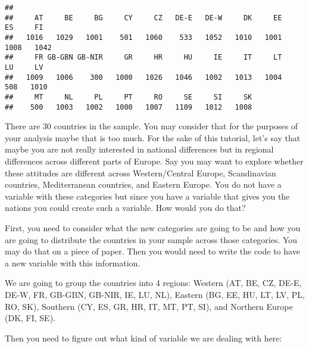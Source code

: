 \documentclass[
]{book}
\newenvironment{Shaded}{\begin{snugshade}}{\end{snugshade}}
\newcommand{\FunctionTok}[1]{\textcolor[rgb]{0.13,0.29,0.53}{\textbf{#1}}}
\newcommand{\NormalTok}[1]{#1}
\newcommand{\SpecialCharTok}[1]{\textcolor[rgb]{0.81,0.36,0.00}{\textbf{#1}}}
\begin{document}
\begin{Shaded}
\end{Shaded}

\begin{verbatim}
## 
##     AT     BE     BG     CY     CZ   DE-E   DE-W     DK     EE     ES     FI 
##   1016   1029   1001    501   1060    533   1052   1010   1001   1008   1042 
##     FR GB-GBN GB-NIR     GR     HR     HU     IE     IT     LT     LU     LV 
##   1009   1006    300   1000   1026   1046   1002   1013   1004    508   1010 
##     MT     NL     PL     PT     RO     SE     SI     SK 
##    500   1003   1002   1000   1007   1109   1012   1008
\end{verbatim}

There are 30 countries in the sample. You may consider that for the purposes of your analysis maybe that is too much. For the sake of this tutorial, let's say that maybe you are not really interested in national differences but in regional differences across different parts of Europe. Say you may want to explore whether these attitudes are different across Western/Central Europe, Scandinavian countries, Mediterranean countries, and Eastern Europe. You do not have a variable with these categories but since you have a variable that gives you the nations you could create such a variable. How would you do that?

First, you need to consider what the new categories are going to be and how you are going to distribute the countries in your sample across those categories. You may do that on a piece of paper. Then you would need to write the code to have a new variable with this information.

We are going to group the countries into 4 regions: Western (AT, BE, CZ, DE-E, DE-W, FR, GB-GBN, GB-NIR, IE, LU, NL), Eastern (BG, EE, HU, LT, LV, PL, RO, SK), Southern (CY, ES, GR, HR, IT, MT, PT, SI), and Northern Europe (DK, FI, SE).

Then you need to figure out what kind of variable we are dealing with here:

\begin{Shaded}
\end{Shaded}
\end{document}

